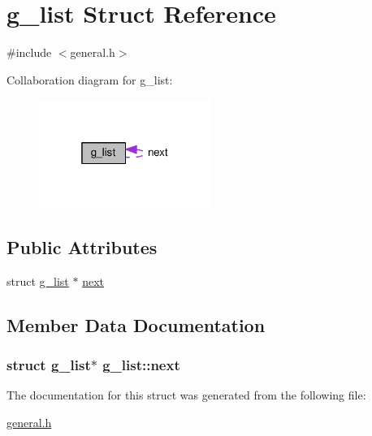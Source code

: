 \hypertarget{structg__list}{}\section{g\+\_\+list Struct Reference}
\label{structg__list}


{\ttfamily \#include $<$general.\+h$>$}



Collaboration diagram for g\+\_\+list\+:
\nopagebreak
\begin{figure}[H]
\begin{center}
\leavevmode
\includegraphics[width=160pt]{structg__list__coll__graph}
\end{center}
\end{figure}
\subsection*{Public Attributes}
\begin{DoxyCompactItemize}
\item 
struct \hyperlink{structg__list}{g\+\_\+list} $\ast$ \hyperlink{structg__list_ada1d543e69873d9bd861eb115dd6b7c2}{next}
\end{DoxyCompactItemize}


\subsection{Member Data Documentation}
\subsubsection[{\texorpdfstring{next}{next}}]{\setlength{\rightskip}{0pt plus 5cm}struct {\bf g\+\_\+list}$\ast$ g\+\_\+list\+::next}\hypertarget{structg__list_ada1d543e69873d9bd861eb115dd6b7c2}{}\label{structg__list_ada1d543e69873d9bd861eb115dd6b7c2}


The documentation for this struct was generated from the following file\+:\begin{DoxyCompactItemize}
\item 
\hyperlink{general_8h}{general.\+h}\end{DoxyCompactItemize}
